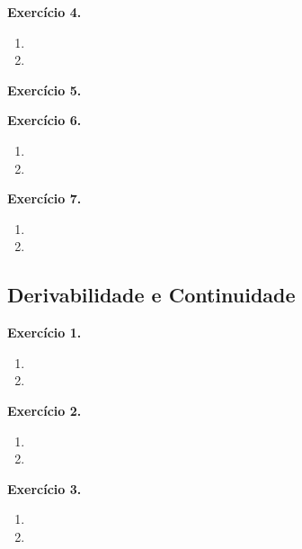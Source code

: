 \documentclass[12pt,a4paper]{article}
\begin{document}
\vspace{0.5cm}
\noindent\textbf{Exercício 4.}
\begin{enumerate}
    \renewcommand{\theenumi}{\alph{enumi}}
    \renewcommand{\labelenumi}{\theenumi)}
    \item 
    \item 
\end{enumerate}

\vspace{0.5cm}
\noindent\textbf{Exercício 5.}

\vspace{0.5cm}
\noindent\textbf{Exercício 6.}
\begin{enumerate}
    \renewcommand{\theenumi}{\alph{enumi}}
    \renewcommand{\labelenumi}{\theenumi)}
    \item 
    \item 
\end{enumerate}

\vspace{0.5cm}
\noindent\textbf{Exercício 7.}
\begin{enumerate}
    \renewcommand{\theenumi}{\alph{enumi}}
    \renewcommand{\labelenumi}{\theenumi)}
    \item 
    \item 
\end{enumerate}

\subsection{Derivabilidade e Continuidade}

\vspace{0.5cm}
\noindent\textbf{Exercício 1.}
\begin{enumerate}
    \renewcommand{\theenumi}{\alph{enumi}}
    \renewcommand{\labelenumi}{\theenumi)}
    \item 
    \item 
\end{enumerate}

\vspace{0.5cm}
\noindent\textbf{Exercício 2.}
\begin{enumerate}
    \renewcommand{\theenumi}{\alph{enumi}}
    \renewcommand{\labelenumi}{\theenumi)}
    \item 
    \item 
\end{enumerate}

\vspace{0.5cm}
\noindent\textbf{Exercício 3.}
\begin{enumerate}
    \renewcommand{\theenumi}{\alph{enumi}}
    \renewcommand{\labelenumi}{\theenumi)}
    \item 
    \item 
\end{enumerate}
\end{document}
